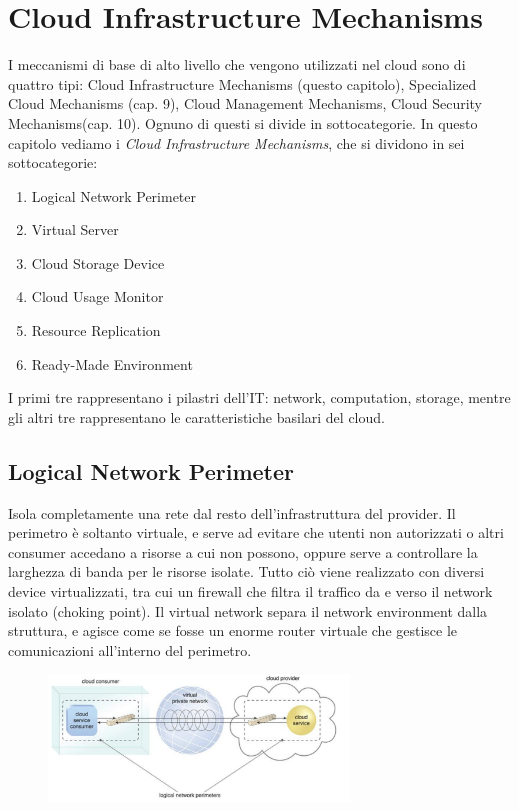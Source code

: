 \chapter{Cloud Infrastructure Mechanisms}
I meccanismi di base di alto livello che vengono utilizzati nel cloud sono di quattro tipi: Cloud Infrastructure Mechanisms (questo capitolo), Specialized Cloud Mechanisms (cap. 9), Cloud Management Mechanisms, Cloud Security Mechanisms(cap. 10).
Ognuno di questi si divide in sottocategorie. In questo capitolo vediamo i \textit{Cloud Infrastructure Mechanisms}, che si dividono in sei sottocategorie:
\begin{enumerate}
    \item Logical Network Perimeter
    \item Virtual Server
    \item Cloud Storage Device
    \item Cloud Usage Monitor
    \item Resource Replication
    \item Ready-Made Environment
\end{enumerate}
I primi tre rappresentano i pilastri dell'IT: network, computation, storage, mentre gli altri tre rappresentano le caratteristiche basilari del cloud.

\section{Logical Network Perimeter}
Isola completamente una rete dal resto dell'infrastruttura del provider. Il perimetro è soltanto virtuale, e serve ad evitare che utenti non autorizzati o altri consumer accedano a risorse a cui non possono, oppure serve a controllare la larghezza di banda per le risorse isolate. Tutto ciò viene realizzato con diversi device virtualizzati, tra cui un firewall che filtra il traffico da e verso il network isolato (choking point). Il virtual network separa il network environment dalla struttura, e agisce come se fosse un enorme router virtuale che gestisce le comunicazioni all'interno del perimetro.

\begin{figure}[htb!]
    \centering
    \includegraphics[width=8cm]{./Images/cap8/8.1.png}
\end{figure}

